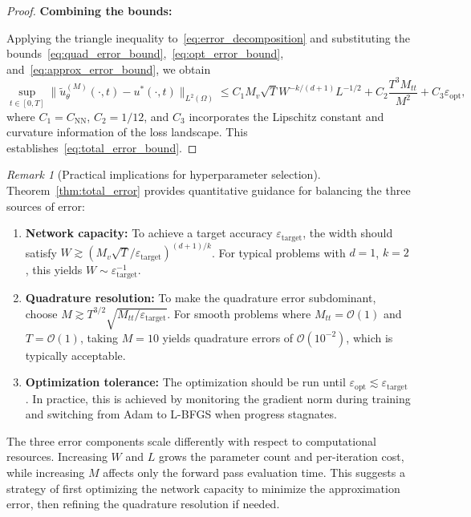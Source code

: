 \documentclass[11pt,reqno]{amsart}
\theoremstyle{plain}
\theoremstyle{definition}
\theoremstyle{remark}
\newtheorem{remark}[theorem]{Remark}
\begin{document}
\begin{proof}
\medskip
\noindent\textbf{Combining the bounds:}

\noindent Applying the triangle inequality to~\eqref{eq:error_decomposition} and substituting the bounds~\eqref{eq:quad_error_bound},~\eqref{eq:opt_error_bound}, and~\eqref{eq:approx_error_bound}, we obtain
\begin{equation}
    \sup_{t \in [0,T]} \|\tilde{u}_\theta^{(M)}(\cdot, t) - u^*(\cdot, t)\|_{L^2(\Omega)} \leq C_1 M_v \sqrt{T} W^{-k/(d+1)} L^{-1/2} + C_2 \frac{T^3 M_{tt}}{M^2} + C_3 \varepsilon_{\mathrm{opt}},
\end{equation}
where $C_1 = C_{\mathrm{NN}}$, $C_2 = 1/12$, and $C_3$ incorporates the Lipschitz constant and curvature information of the loss landscape. This establishes~\eqref{eq:total_error_bound}.
\end{proof}

\begin{remark}[Practical implications for hyperparameter selection]
Theorem~\ref{thm:total_error} provides quantitative guidance for balancing the three sources of error:

\begin{enumerate}
    \item \textbf{Network capacity:} To achieve a target accuracy $\varepsilon_{\mathrm{target}}$, the width should satisfy $W \gtrsim (M_v \sqrt{T} / \varepsilon_{\mathrm{target}})^{(d+1)/k}$. For typical problems with $d=1$, $k=2$, this yields $W \sim \varepsilon_{\mathrm{target}}^{-1}$.
    
    \item \textbf{Quadrature resolution:} To make the quadrature error subdominant, choose $M \gtrsim T^{3/2} \sqrt{M_{tt} / \varepsilon_{\mathrm{target}}}$. For smooth problems where $M_{tt} = \mathcal{O}(1)$ and $T = \mathcal{O}(1)$, taking $M = 10$ yields quadrature errors of $\mathcal{O}(10^{-2})$, which is typically acceptable.
    
    \item \textbf{Optimization tolerance:} The optimization should be run until $\varepsilon_{\mathrm{opt}} \lesssim \varepsilon_{\mathrm{target}}$. In practice, this is achieved by monitoring the gradient norm during training and switching from Adam to L-BFGS when progress stagnates.
\end{enumerate}

\noindent The three error components scale differently with respect to computational resources. Increasing $W$ and $L$ grows the parameter count and per-iteration cost, while increasing $M$ affects only the forward pass evaluation time. This suggests a strategy of first optimizing the network capacity to minimize the approximation error, then refining the quadrature resolution if needed.
\end{remark}
\end{document}
